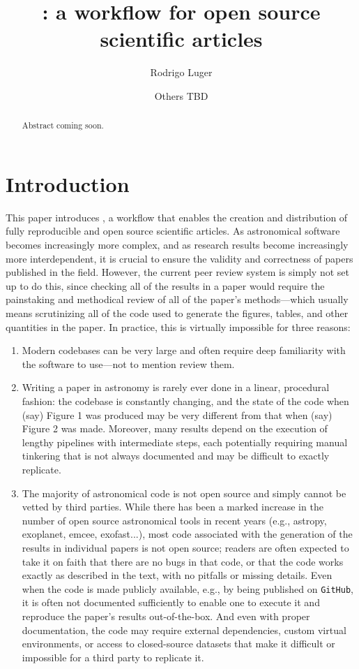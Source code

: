 \documentclass[twocolumn]{aastex631}
\begin{document}
\title{\showyourwork: a workflow for open source scientific articles}

\author[0000-0002-0296-3826]{Rodrigo Luger}
\author{Others TBD}

\begin{abstract}
    Abstract coming soon.
\end{abstract}

\section{Introduction}
\label{sec:intro}

This paper introduces \showyourwork, a workflow that enables the creation and distribution of fully reproducible and open source scientific articles. 
As astronomical software becomes increasingly more complex, and as research results become increasingly more interdependent, it is crucial to ensure the validity and correctness of papers published in the field.
However, the current peer review system is simply not set up to do this, since checking all of the results in a paper would require the painstaking and methodical review of all of the paper's methods—which usually means scrutinizing all of the code used to generate the figures, tables, and other quantities in the paper. 
In practice, this is virtually impossible for three reasons:

\begin{enumerate}
    \item Modern codebases can be very large and often require deep familiarity with the software to use—not to mention review them.
    \item  Writing a paper in astronomy is rarely ever done in a linear, procedural fashion: the codebase is constantly changing, and the state of the code when (say) Figure 1 was produced may be very different from that when (say) Figure 2 was made. 
    Moreover, many results depend on the execution of lengthy pipelines with intermediate steps, each potentially requiring manual tinkering that is not always documented and may be difficult to exactly replicate.
    \item The majority of astronomical code is not open source and simply cannot be vetted by third parties. 
    While there has been a marked increase in the number of open source astronomical tools in recent years (e.g., astropy, exoplanet, emcee, exofast...), most code associated with the generation of the results in individual papers is not open source; readers are often expected to take it on faith that there are no bugs in that code, or that the code works exactly as described in the text, with no pitfalls or missing details. 
    Even when the code is made publicly available, e.g., by being published on \texttt{GitHub}, it is often not documented sufficiently to enable one to execute it and reproduce the paper's results out-of-the-box. 
    And even with proper documentation, the code may require external dependencies, custom virtual environments, or access to closed-source datasets that make it difficult or impossible for a third party to replicate it.
\end{enumerate}
\end{document}
